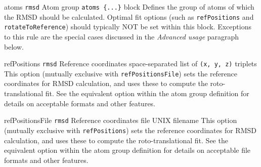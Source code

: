 \begin{cvcoptions}

\item %
  \key
    {atoms}{%
    \texttt{rmsd}}{%
    Atom group}{%
    \texttt{atoms~\{...\}} block}{%
    Defines the group of atoms of which the RMSD should be calculated.
    Optimal fit options (such as \texttt{refPositions} and
    \texttt{rotateToReference}) should typically NOT be set within this
    block. Exceptions to this rule are the special cases discussed in
    the \emph{Advanced usage} paragraph below.
    }

\item %
  \key
    {refPositions}{%
    \texttt{rmsd}}{%
    Reference coordinates}{%
    space-separated list of \texttt{(x, y, z)} triplets}{%
    This option (mutually exclusive with \texttt{refPositionsFile}) sets the reference coordinates for RMSD calculation, and uses these to compute the roto-translational fit.
    See the equivalent option  within the atom group definition for details on acceptable formats and other features.
    }

\item %
  \key
    {refPositionsFile}{%
    \texttt{rmsd}}{%
    Reference coordinates file}{%
    UNIX filename}{%
    This option (mutually exclusive with \texttt{refPositions}) sets the reference coordinates for RMSD calculation, and uses these to compute the roto-translational fit.
    See the equivalent option  within the atom group definition for details on acceptable file formats and other features.
    }



\end{cvcoptions}
